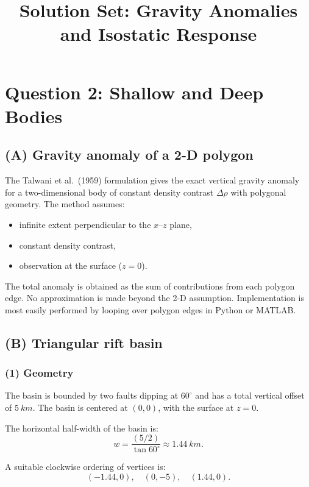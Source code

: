 \documentclass[11pt,a4paper]{article}
\title{Solution Set: Gravity Anomalies and Isostatic Response}
\author{}
\date{}
\begin{document}
\maketitle

\section*{Question 2: Shallow and Deep Bodies}

\subsection*{(A) Gravity anomaly of a 2-D polygon}

The Talwani et al.\ (1959) formulation gives the exact vertical gravity anomaly for a
two-dimensional body of constant density contrast $\Delta\rho$ with polygonal geometry.
The method assumes:
\begin{itemize}
    \item infinite extent perpendicular to the $x$--$z$ plane,
    \item constant density contrast,
    \item observation at the surface ($z=0$).
\end{itemize}

The total anomaly is obtained as the sum of contributions from each polygon edge.
No approximation is made beyond the 2-D assumption. Implementation is most easily
performed by looping over polygon edges in Python or MATLAB.

\subsection*{(B) Triangular rift basin}

\subsubsection*{(1) Geometry}

The basin is bounded by two faults dipping at $60^\circ$ and has a total vertical
offset of $\SI{5}{km}$. The basin is centered at $(0,0)$, with the surface at $z=0$.

The horizontal half-width of the basin is:
\[
w = \frac{(5/2)}{\tan 60^\circ} \approx \SI{1.44}{km}.
\]

A suitable clockwise ordering of vertices is:
\[
(-1.44,0), \quad (0,-5), \quad (1.44,0).
\]
\end{document}
